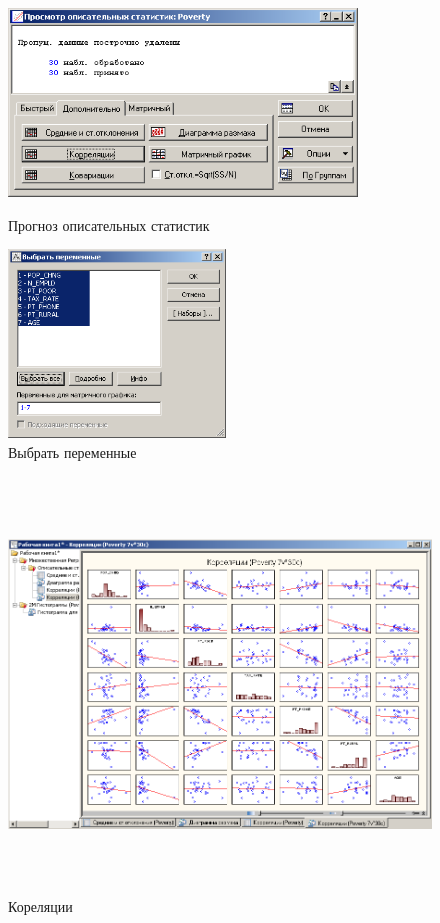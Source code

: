 \begin{figure}[!h]
  \centering
  \begin{minipage}{0.49\textwidth}
    \centering

    \includegraphics[height=5cm]
    {inc/example_16.PNG}

    \caption{Прогноз описательных статистик}
    \label{fig:example_16}
  \end{minipage}
  \begin{minipage}{0.49\textwidth}
    \centering

    \includegraphics[height=5cm]
    {inc/example_17.PNG}

    \caption{Выбрать переменные}
    \label{fig:example_17}
  \end{minipage}
\end{figure}

\begin{figure}[!h]
  \centering

  \includegraphics[height=11cm]
  {inc/example_18.PNG}

  \caption{Кореляции}

  \label{fig:example_18}
\end{figure}

